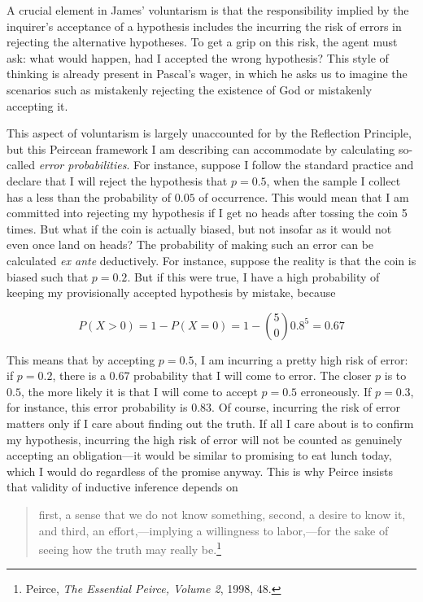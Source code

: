 A crucial element in James' voluntarism is that the responsibility
implied by the inquirer's acceptance of a hypothesis includes the
incurring the risk of errors in rejecting the alternative hypotheses. To
get a grip on this risk, the agent must ask: what would happen, had I
accepted the wrong hypothesis? This style of thinking is already present
in Pascal's wager, in which he asks us to imagine the scenarios such as
mistakenly rejecting the existence of God or mistakenly accepting it.

This aspect of voluntarism is largely unaccounted for by the Reflection
Principle, but this Peircean framework I am describing can accommodate
by calculating so-called \emph{error probabilities}. For instance,
suppose I follow the standard practice and declare that I will reject
the hypothesis that \(p=0.5\), when the sample I collect has a less than
the probability of \(0.05\) of occurrence. This would mean that I am
committed into rejecting my hypothesis if I get no heads after tossing
the coin 5 times. But what if the coin is actually biased, but not
insofar as it would not even once land on heads? The probability of
making such an error can be calculated \emph{ex ante} deductively. For
instance, suppose the reality is that the coin is biased such that
\(p=0.2\). But if this were true, I have a high probability of keeping
my provisionally accepted hypothesis by mistake, because

\[P(X > 0) = 1 - P(X=0) = 1 - {5 \choose 0} 0.8^5 = 0.67\]

This means that by accepting \(p=0.5\), I am incurring a pretty high
risk of error: if \(p=0.2\), there is a 0.67 probability that I will
come to error. The closer \(p\) is to \(0.5\), the more likely it is
that I will come to accept \(p=0.5\) erroneously. If \(p=0.3\), for
instance, this error probability is \(0.83\). Of course, incurring the
risk of error matters only if I care about finding out the truth. If all
I care about is to confirm my hypothesis, incurring the high risk of
error will not be counted as genuinely accepting an obligation---it
would be similar to promising to eat lunch today, which I would do
regardless of the promise anyway. This is why Peirce insists that
validity of inductive inference depends on

\begin{quote}
first, a sense that we do not know something, second, a desire to know
it, and third, an effort,---implying a willingness to labor,---for the
sake of seeing how the truth may really be.\footnote{Peirce, \emph{The
  Essential Peirce, Volume 2}, 1998, 48.}
\end{quote}

